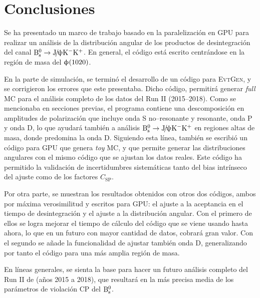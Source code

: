 













\section{Conclusiones}

Se ha presentado un marco de trabajo basado en la paralelización en GPU para realizar un análisis de la distribución angular de los productos de desintegración del canal $\text{B}{}_{\text{s}}^{0} \rightarrow \text{J}\!/\!\uppsi \text{K}{}^{-} \text{K}{}^{+}$. En general, el código está escrito centrándose en la región de masa del $\upphi(1020)$. 

En la parte de simulación, se terminó el desarrollo de un código para \textsc{EvtGen}, y se corrigieron los errores que este presentaba. Dicho código, permitirá generar \emph{full} MC para el análisis completo de los datos del Run II (2015--2018). Como se mencionaba en secciones previas, el programa contiene una descomposición en amplitudes de polarización que incluye onda S no--resonante y resonante, onda P y onda D, lo que ayudará también a análisis $\text{B}{}_{\text{s}}^{0} \rightarrow \text{J}\!/\!\uppsi \text{K}{}^{-} \text{K}{}^{+}$ en regiones altas de masa, donde predomina la onda D.
Siguiendo esta línea, también se escribió un código para GPU que genera \emph{toy} MC, y que permite generar las distribuciones angulares con el mismo código que se ajustan los datos reales. Este código ha permitido la validación de incertidumbres sistemáticas tanto del bias intrínseco del ajuste como de los factores $C_{\text{SP}}$.

Por otra parte, se muestran los resultados obtenidos con otros dos códigos, ambos por máxima verosimilitud y escritos para GPU: el ajuste a la aceptancia en el tiempo de desintegración y el ajuste a la distribución angular. Con el primero de ellos se logra mejorar el tiempo de cálculo del código que se viene usando hasta ahora, lo que en un futuro con mayor cantidad de datos, cobrará gran valor. Con el segundo se añade la funcionalidad de ajustar también onda D, generalizando por tanto el código para una más amplia región de masa.

 
En líneas generales, se sienta la base para hacer un futuro análisis completo del Run II de \lhcb (años 2015 a 2018), que resultará en la más precisa media de los parámetros de violación CP del $\text{B}{}_{\text{s}}^{0}$.



